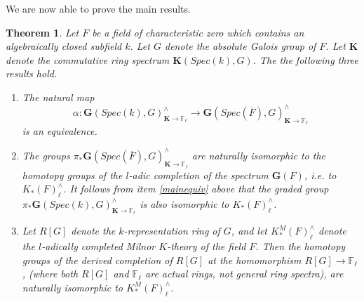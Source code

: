 \documentclass[11pt]{article}
\newcommand\mb{\mathbb}
\def \bK{\mathbf K}
\newcommand\mfk{\mathbf G}
\newtheorem{Theorem}{Theorem}[section]
\begin{document}
   We are now able to prove the main results. 
\begin{Theorem}\label{finaltheorem}  Let $F$ be a field of characteristic zero which contains an algebraically closed subfield $k$. Let $G$ denote the absolute Galois group of $F$.  Let $\bK$ denote the commutative ring spectrum $\bK (Spec(k),G) $.     The the following three  results hold. 
\begin{enumerate}[label=(\arabic*), font=\upshape]

\item{\label{mainequiv} The natural map 
$$ \alpha: \mfk(Spec(k), G)^{\wedge}_{\bK \rightarrow \mb{F}_{\ell} } \rightarrow \mfk(Spec(\overline{F}), G)^{\wedge}_{\bK \rightarrow \mb{F}_{\ell}}
$$ 
is an equivalence.  }
\item{The groups $\pi _*\mfk(Spec(\overline{F}), G)^{\wedge}_{\bK \rightarrow \mb{F}_{\ell}}$ are naturally isomorphic to the homotopy groups of the $l$-adic completion of the spectrum $\mfk(F)$, i.e. to $K_*(F)^{\wedge}_{\ell}$. It follows from item  \ref{mainequiv} above that the graded group  $\pi_*\mfk(Spec(k), G)^{\wedge}_{\bK \rightarrow \mb{F}_{\ell}}$ is  also isomorphic to  $K_*(F)^{\wedge}_{\ell}$.   }
\item{Let $R[G]$ denote the $k$-representation ring of $G$, and let $K_*^{M}(F) ^{\wedge}_{\ell}$ denote the $l$-adically completed Milnor $K$-theory of the field $F$.  Then the homotopy groups of the derived completion of $R[G]$  at the homomorphism $R[G]\rightarrow \mb{F}_{\ell}$, (where both $R[G]$ and $\mb{F}_{\ell}$ are actual rings, not general ring spectra), are naturally isomorphic to $K_*^{M}(F) ^{\wedge}_{\ell}$.   }
\end{enumerate}
    
\end{Theorem}
\end{document}
